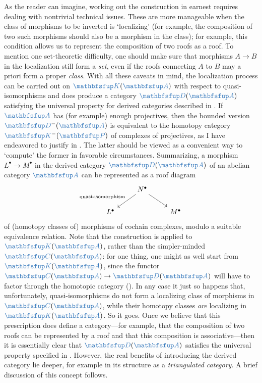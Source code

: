As the reader can imagine, working out the construction in earnest
requires dealing with nontrivial technical issues. These are more
manageable when the class of morphisms to be inverted is `localizing'
(for example, the composition of two such morphisms should also be a
morphism in the class); for example, this condition allows us to
represent the composition of two roofs as a roof. To mention one
set-theoretic difficulty, one should make sure that morphisms
$A \to B$ in the localization still form a \emph{set}, even if the
roofs connecting $A$ to $B$ may a priori form a proper \emph{class}.
With all these caveats in mind, the localization process can be
carried out on $\categ{K}(\categ{A})$ with respect to
quasi-isomorphisms and does produce a category $\categ{D}(\categ{A})$
satisfying the universal property for derived categories described in
. If
$\categ{A}$ has (for example) enough projectives, then the bounded
version $\categ{D}^-(\categ{A})$ is equivalent to the homotopy
category $\categ{K}^-(\categ{P})$ of complexes of projectives, as I
have endeavored to justify in
. The latter should
be viewed as a convenient way to `compute' the former in favorable
circumstances.  Summarizing, a morphism $L^\bullet \to M^\bullet$ in
the derived category $\categ{D}(\categ{A})$ of an abelian category
$\categ{A}$ can be represented as a roof diagram
\[\begin{tikzcd}
    & N^\bullet \arrow[dl,"\text{quasi-isomorphism}"'] \arrow[dr] & \\
    L^\bullet & & M^\bullet
  \end{tikzcd}\] of (homotopy classes of) morphisms of cochain
complexes, modulo a suitable equivalence relation. Note that the
construction is applied to $\categ{K}(\categ{A})$, rather than the
simpler-minded $\categ{C}(\categ{A})$: for one thing, one might as
well start from $\categ{K}(\categ{A})$, since the functor
$\categ{C}(\categ{A}) \to \categ{D}(\categ{A})$ will have to factor
through the homotopic category (). In
any case it just so happens that, unfortunately, quasi-isomorphisms do
not form a localizing class of morphisms in $\categ{C}(\categ{A})$,
while their homotopy classes \emph{are} localizing in
$\categ{K}(\categ{A})$. So it goes.  Once we believe that this
prescription does define a category---for example, that the
composition of two roofs can be represented by a roof and that this
composition is associative---then it is essentially clear that
$\categ{D}(\categ{A})$ satisfies the universal property specified in
. However,
the real benefits of introducing the derived category lie deeper, for
example in its structure as a \emph{triangulated category}. A brief
discussion of this concept follows.

